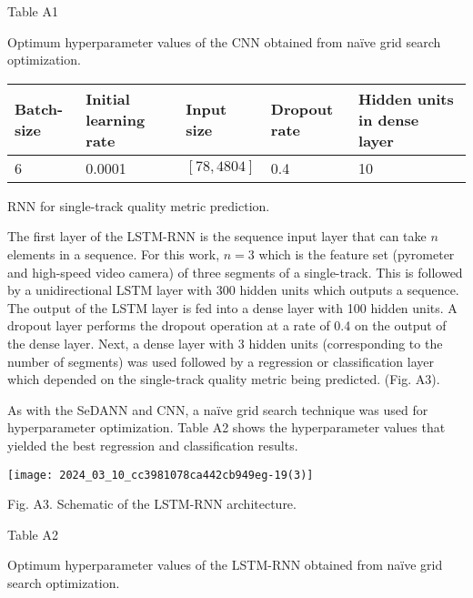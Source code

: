 \documentclass[10pt]{article}
\begin{document}
Table A1

Optimum hyperparameter values of the CNN obtained from naïve grid search optimization.

\begin{center}
\begin{tabular}{lllll}
\hline
Batch-size & Initial learning rate & Input size & Dropout rate & Hidden units in dense layer \\
\hline
6 & 0.0001 & $[78,4804]$ & 0.4 & 10 \\
\hline
\end{tabular}
\end{center}

RNN for single-track quality metric prediction.

The first layer of the LSTM-RNN is the sequence input layer that can take $n$ elements in a sequence. For this work, $n=3$ which is the feature set (pyrometer and high-speed video camera) of three segments of a single-track. This is followed by a unidirectional LSTM layer with 300 hidden units which outputs a sequence. The output of the LSTM layer is fed into a dense layer with 100 hidden units. A dropout layer performs the dropout operation at a rate of 0.4 on the output of the dense layer. Next, a dense layer with 3 hidden units (corresponding to the number of segments) was used followed by a regression or classification layer which depended on the single-track quality metric being predicted. (Fig. A3).

As with the SeDANN and CNN, a naïve grid search technique was used for hyperparameter optimization. Table A2 shows the hyperparameter values that yielded the best regression and classification results.

\begin{center}
\texttt{[image: 2024\_03\_10\_cc3981078ca442cb949eg-19(3)]}
\end{center}

Fig. A3. Schematic of the LSTM-RNN architecture.

Table A2

Optimum hyperparameter values of the LSTM-RNN obtained from naïve grid search optimization.
\end{document}
